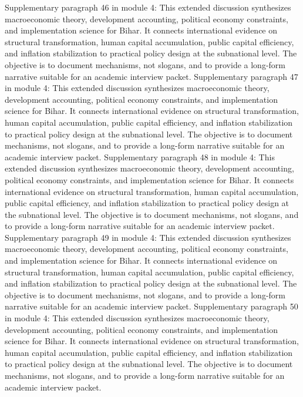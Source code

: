 \documentclass[preprint,12pt]{elsarticle}
\begin{document}
Supplementary paragraph 46 in module 4: This extended discussion synthesizes macroeconomic theory, development accounting, political economy constraints, and implementation science for Bihar. It connects international evidence on structural transformation, human capital accumulation, public capital efficiency, and inflation stabilization to practical policy design at the subnational level. The objective is to document mechanisms, not slogans, and to provide a long-form narrative suitable for an academic interview packet.
Supplementary paragraph 47 in module 4: This extended discussion synthesizes macroeconomic theory, development accounting, political economy constraints, and implementation science for Bihar. It connects international evidence on structural transformation, human capital accumulation, public capital efficiency, and inflation stabilization to practical policy design at the subnational level. The objective is to document mechanisms, not slogans, and to provide a long-form narrative suitable for an academic interview packet.
Supplementary paragraph 48 in module 4: This extended discussion synthesizes macroeconomic theory, development accounting, political economy constraints, and implementation science for Bihar. It connects international evidence on structural transformation, human capital accumulation, public capital efficiency, and inflation stabilization to practical policy design at the subnational level. The objective is to document mechanisms, not slogans, and to provide a long-form narrative suitable for an academic interview packet.
Supplementary paragraph 49 in module 4: This extended discussion synthesizes macroeconomic theory, development accounting, political economy constraints, and implementation science for Bihar. It connects international evidence on structural transformation, human capital accumulation, public capital efficiency, and inflation stabilization to practical policy design at the subnational level. The objective is to document mechanisms, not slogans, and to provide a long-form narrative suitable for an academic interview packet.
Supplementary paragraph 50 in module 4: This extended discussion synthesizes macroeconomic theory, development accounting, political economy constraints, and implementation science for Bihar. It connects international evidence on structural transformation, human capital accumulation, public capital efficiency, and inflation stabilization to practical policy design at the subnational level. The objective is to document mechanisms, not slogans, and to provide a long-form narrative suitable for an academic interview packet.
\end{document}
